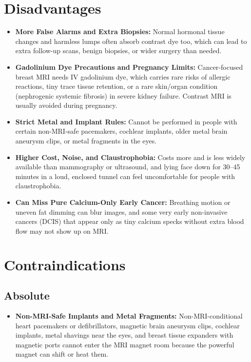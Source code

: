 \section{Disadvantages}
\begin{itemize}
\item \textbf{More False Alarms and Extra Biopsies:} Normal hormonal tissue changes and harmless lumps often absorb contrast dye too, which can lead to extra follow-up scans, benign biopsies, or wider surgery than needed.
\item \textbf{Gadolinium Dye Precautions and Pregnancy Limits:} Cancer-focused breast MRI needs IV gadolinium dye, which carries rare risks of allergic reactions, tiny trace tissue retention, or a rare skin/organ condition (nephrogenic systemic fibrosis) in severe kidney failure. Contrast MRI is usually avoided during pregnancy.
\item \textbf{Strict Metal and Implant Rules:} Cannot be performed in people with certain non-MRI-safe pacemakers, cochlear implants, older metal brain aneurysm clips, or metal fragments in the eyes.
\item \textbf{Higher Cost, Noise, and Claustrophobia:} Costs more and is less widely available than mammography or ultrasound, and lying face down for 30--45 minutes in a loud, enclosed tunnel can feel uncomfortable for people with claustrophobia.
\item \textbf{Can Miss Pure Calcium-Only Early Cancer:} Breathing motion or uneven fat dimming can blur images, and some very early non-invasive cancers (DCIS) that appear only as tiny calcium specks without extra blood flow may not show up on MRI.
\end{itemize}

\section{Contraindications}

\subsection{Absolute}
\begin{itemize}
\item \textbf{Non-MRI-Safe Implants and Metal Fragments:} Non-MRI-conditional heart pacemakers or defibrillators, magnetic brain aneurysm clips, cochlear implants, metal shavings near the eyes, and breast tissue expanders with magnetic ports cannot enter the MRI magnet room because the powerful magnet can shift or heat them.
\end{itemize}

